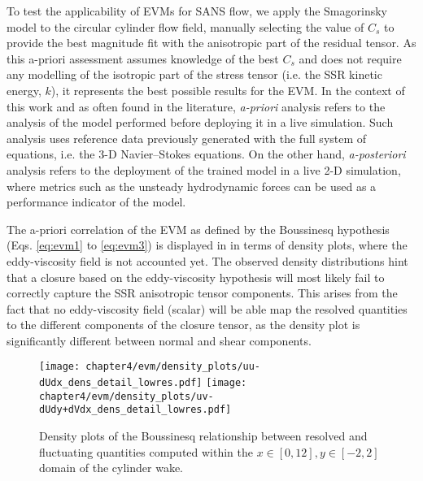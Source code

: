 \documentclass[../main.tex]{subfiles}
\begin{document}
To test the applicability of EVMs for SANS flow, we apply the Smagorinsky model to the circular cylinder flow field, manually selecting the value of $C_s$ to provide the best magnitude fit with the anisotropic part of the residual tensor.
As this a-priori assessment assumes knowledge of the best $C_s$ and does not require any modelling of the isotropic part of the stress tensor (i.e. the SSR kinetic energy, $k$), it represents the best possible results for the EVM\footnotemark.
In the context of this work and as often found in the literature, \textit{a-priori} analysis refers to the analysis of the model performed before deploying it in a live simulation.
Such analysis uses reference data previously generated with the full system of equations, i.e. the 3-D Navier--Stokes equations.
On the other hand, \textit{a-posteriori} analysis refers to the deployment of the trained model in a live 2-D simulation, where metrics such as the unsteady hydrodynamic forces can be used as a performance indicator of the model.


The a-priori correlation of the EVM as defined by the Boussinesq hypothesis (Eqs. \ref{eq:evm1} to \ref{eq:evm3}) is displayed in  in terms of density plots, where the eddy-viscosity field is not accounted yet.
The observed density distributions hint that a closure based on the eddy-viscosity hypothesis will most likely fail to correctly capture the SSR anisotropic tensor components.
This arises from the fact that no eddy-viscosity field (scalar) will be able map the resolved quantities to the different components of the closure tensor, as the density plot is significantly different between normal and shear components.

\begin{figure}[!t]
\centering
    \texttt{[image: chapter4/evm/density\_plots/uu-dUdx\_dens\_detail\_lowres.pdf]}\hspace{1em}
    \texttt{[image: chapter4/evm/density\_plots/uv-dUdy+dVdx\_dens\_detail\_lowres.pdf]}
\caption{Density plots of the Boussinesq relationship between resolved and fluctuating quantities computed within the $x \in [0, 12], y \in [-2, 2]$ domain of the cylinder wake.}
\label{fig:evm_density_plots}
\end{figure}
\end{document}
